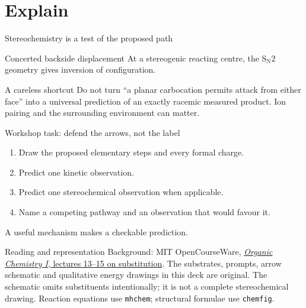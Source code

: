 \documentclass[11pt,aspectratio=169]{beamer}
\begin{document}
\section{Explain}
\begin{frame}{Stereochemistry is a test of the proposed path}
\begin{block}{Concerted backside displacement}
At a stereogenic reacting centre, the $\mathrm{S_N2}$ geometry gives inversion of configuration.
\end{block}
\begin{alertblock}{A careless shortcut}
Do not turn ``a planar carbocation permits attack from either face'' into a universal prediction of an exactly racemic measured product. Ion pairing and the surrounding environment can matter.
\end{alertblock}
\end{frame}
\begin{frame}{Workshop task: defend the arrows, not the label}
\begin{enumerate}
\item Draw the proposed elementary steps and every formal charge.
\item Predict one kinetic observation.
\item Predict one stereochemical observation when applicable.
\item Name a competing pathway and an observation that would favour it.
\end{enumerate}
\bigskip
A useful mechanism makes a checkable prediction.
\end{frame}
\begin{frame}{Reading and representation}
\small
Background: MIT OpenCourseWare, \href{https://ocw.mit.edu/courses/5-12-organic-chemistry-i-spring-2003/pages/calendar/}{\emph{Organic Chemistry I}, lectures 13--15 on substitution}.
\medskip
The substrates, prompts, arrow schematic and qualitative energy drawings in this deck are original. The schematic omits substituents intentionally; it is not a complete stereochemical drawing. Reaction equations use \texttt{mhchem}; structural formulae use \texttt{chemfig}.
\end{frame}
\end{document}
